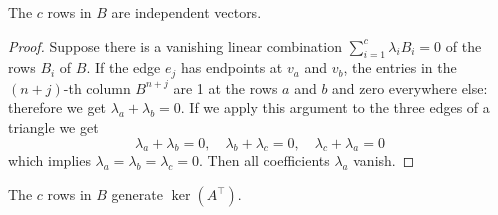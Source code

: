\begin{lemma} The $c$ rows in $B$ are independent vectors.
\end{lemma}
\begin{proof}
Suppose there is a vanishing linear combination $\sum_{i=1}^c \lambda_i B_i = 0$ of the rows $B_i$ of $B$. If the edge $e_j$ has endpoints at $v_a$ and $v_b$, the entries in the $(n+j)$-th column $B^{n+j}$ are 1 at the rows $a$ and $b$ and zero everywhere else: therefore we get $\lambda_a+\lambda_b=0$. If we apply this argument to the three edges of a triangle we get
$$\lambda_a+\lambda_b=0, \quad \lambda_b+\lambda_c=0, \quad \lambda_c+\lambda_a = 0$$
which implies $\lambda_a=\lambda_b=\lambda_c=0$. Then all coefficients $\lambda_a$ vanish.
\end{proof}

\begin{lemma} \label{B:surj:lemma}
The $c$ rows in $B$ generate $\ker(A^\intercal)$. 
\end{lemma}
